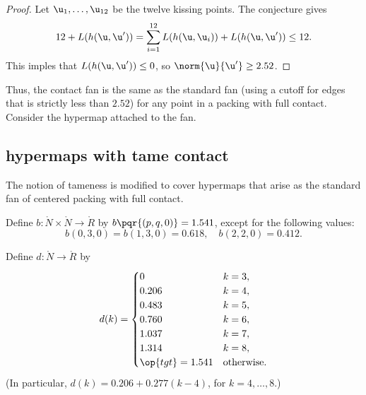 \begin{proof} Let $ \u_1,\ldots, \u_{12}$ be the twelve kissing
  points.  The conjecture gives
\begin{displaymath}
  12 + L(h( \u, \u')) 
= \sum_{i=1}^{12} L(h( \u, \u_i)) + L(h( \u, \u')) \le 12.
\end{displaymath}
This imples that $L(h( \u, \u'))\le 0$, so $\norm{ \u}{ \u'}\ge 2.52$.
\end{proof}

Thus, the contact fan is the same as the standard fan (using a cutoff
for edges that is strictly less than $2.52$) for any point in a
packing with full contact.  Consider the hypermap attached to the fan.
%
%


\subsection{hypermaps with tame contact}

The notion of tameness is modified to cover hypermaps that arise as
the standard fan of centered packing with full contact.
%
%

\begin{definition}[b]
  Define $b:\ring{N}\times \ring{N}\to \ring{R}$ by
  $b\pqr{(p,q,0)}=1.541$, except for the following values:
\begin{displaymath}
b(0,3,0)=b(1,3,0)=0.618,\quad b(2,2,0)=0.412.
\end{displaymath}
\end{definition}
%

\begin{definition}[d]
Define $d:\ring{N}\to \ring{R}$ by
\begin{displaymath}d(k) = \begin{cases}
0 & k=3, \\
0.206 & k=4, \\
0.483 & k=5, \\
0.760 & k=6, \\
1.037 & k=7, \\
1.314 & k=8,\\
\op{tgt}=1.541 & \text{otherwise}.
\end{cases}
\end{displaymath}
(In particular, $d(k) = 0.206 + 0.277 (k-4)$, for $k=4,\ldots,8$.)
\end{definition}
%

